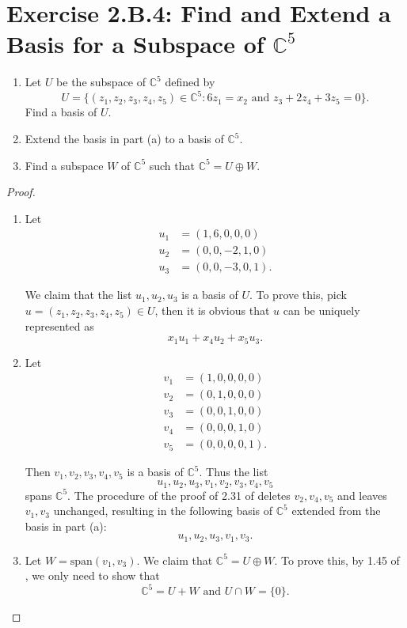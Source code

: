 \section{Exercise 2.B.4: Find and Extend a Basis for a Subspace of $\mathbb{C}^5$}
\begin{enumerate}[label=(\alph*)]
\item Let $U$ be the subspace of $\mathbb{C}^5$ defined by\[
U=\{(z_1,z_2,z_3,z_4,z_5)\in\mathbb{C}^5:6z_1=x_2\text{ and }z_3+2z_4+3z_5=0\}.
\]
Find a basis of $U$.
\item Extend the basis in part (a) to a basis of $\mathbb{C}^5$.
\item Find a subspace $W$ of $\mathbb{C}^5$ such that $\mathbb{C}^5=U\oplus W$.
\end{enumerate}

\begin{proof}
\begin{enumerate}[label=(\alph*)]
\item Let
\begin{equation*}
\begin{split}
u_1&=(1,6,0,0,0)\\
u_2&=(0,0,-2,1,0)\\
u_3&=(0,0,-3,0,1).
\end{split}
\end{equation*}

We claim that the list $u_1,u_2,u_3$ is a basis of $U$. To prove this, pick $u=(z_1,z_2,z_3,z_4,z_5)\in U$, then it is obvious that $u$ can be uniquely represented as\[
x_1u_1+x_4u_2+x_5u_3.
\]
\item Let
\begin{equation*}
\begin{split}
v_1&=(1,0,0,0,0)\\
v_2&=(0,1,0,0,0)\\
v_3&=(0,0,1,0,0)\\
v_4&=(0,0,0,1,0)\\
v_5&=(0,0,0,0,1).
\end{split}
\end{equation*}

Then $v_1,v_2,v_3,v_4,v_5$ is a basis of $\mathbb{C}^5$. Thus the list\[
u_1,u_2,u_3,v_1,v_2,v_3,v_4,v_5
\] spans $\mathbb{C}^5$. The procedure of the proof of 2.31 of \cite{axler2014linear} deletes $v_2,v_4,v_5$ and leaves $v_1,v_3$ unchanged, resulting in the following basis of $\mathbb{C}^5$ extended from the basis in part (a):
\[
u_1,u_2,u_3,v_1,v_3.
\]
\item Let $W=\text{span}(v_1,v_3)$. We claim that $\mathbb{C}^5=U\oplus W$. To prove this, by 1.45 of \cite{axler2014linear}, we only need to show that\[
\mathbb{C}^5=U+W\text{ and }U\cap W=\{0\}.
\]


\end{enumerate}
\end{proof}
